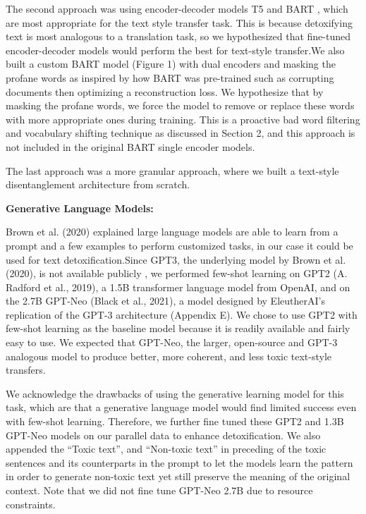 \documentclass[11pt]{article}
\begin{document}
The second approach was using encoder-decoder models T5 and BART , which are most appropriate for the text style transfer task. This is because detoxifying text is most analogous to a translation task, so we hypothesized that fine-tuned encoder-decoder models would perform the best for text-style transfer.We also built a custom BART model (Figure 1) with dual encoders and masking the profane words as inspired by how BART was pre-trained such as corrupting documents then optimizing a reconstruction loss. We hypothesize that by masking the profane words, we force the model to remove or replace these words with more appropriate ones during training. This is a proactive bad word filtering and vocabulary shifting technique as discussed in Section 2, and this approach is not included in the original BART single encoder models. 

The last approach was a more granular approach, where we built a text-style disentanglement architecture from scratch. 

\textbf{Generative Language Models:}

 Brown et al. (2020) explained large language models are able to learn from a prompt and a few examples to perform customized tasks, in our case it could be used for text detoxification.Since GPT3, the underlying model by Brown et al. (2020), is not available publicly , we performed few-shot learning on GPT2 (A. Radford et al., 2019), a 1.5B transformer language model from OpenAI, and on the 2.7B GPT-Neo (Black et al., 2021), a model designed by EleutherAI's replication of the GPT-3 architecture (Appendix E). We chose to use GPT2 with few-shot learning as the baseline model because it is readily available and fairly easy to use. We expected that GPT-Neo, the larger, open-source and GPT-3 analogous model to produce better, more coherent, and less toxic text-style transfers.

We acknowledge the drawbacks of using the generative learning model for this task, which are that a generative language model would find limited success even with few-shot learning. Therefore, we further fine tuned these GPT2 and 1.3B GPT-Neo models on our parallel data to enhance detoxification. We also appended the “Toxic text”, and “Non-toxic text” in preceding of the toxic sentences and its counterparts in the prompt to let the models learn the pattern in order to generate non-toxic text yet still preserve the meaning of the original context.  Note that we did not fine tune GPT-Neo 2.7B due to resource constraints.
\end{document}
